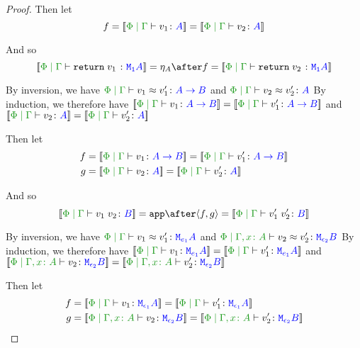 \documentclass{report}
\begin{document}
\begin{framed}
\begin{proof}
        Then let
        \begin{equation}
            f = \deno{\gpetyperelation{v_1}{A}} = \deno{\gpetyperelation{v_2}{A}}
        \end{equation}
        
        And so
        \begin{equation}
            \deno{\gpetyperelation{\return{v_1}}{\M{\1}{A}}} = \point{A}\after f = \deno{\gpetyperelation{\return{v_2}}{\M{\1}{A}}}
        \end{equation}
        
        
        By inversion, we have $\gpeberelation{v_1}{v_1'}{\ab}$ and $\gpeberelation{v_2}{v_2'}{A}$
        By induction, we therefore have $\deno{\gpetyperelation{v_1}{\ab}}= \deno{\gpetyperelation{v_1'}{\ab}}$ and $\deno{\gpetyperelation{v_2}{A}} = \deno{\gpetyperelation{v_2'}{A}}$
        
        Then let
        \begin{align*}
            f &{}= \deno{\gpetyperelation{v_1}{\ab}} = \deno{\gpetyperelation{v_1'}{\ab}}\\
            g &{}= \deno{\gpetyperelation{v_2}{A}} = \deno{\gpetyperelation{v_2'}{A}}
        \end{align*}
        
        
        
        And so
        \begin{equation}
            \deno{\gpetyperelation{\apply{v_1}{v_2}}{B}} = \app\after\pr{f}{g} = \deno{\gpetyperelation{\apply{v_1'}{v_2'}}{B}}
        \end{equation}
        
        
        By inversion, we have $\gpeberelation{v_1}{v_1'}{\M{e_1}{A}}$ and $\eberelation{\P}{\gax}{v_2}{v_2'}{\M{\e_2}{B}}$
        By induction, we therefore have $\deno{\gpetyperelation{v_1}{\M{e_1}{A}}}= \deno{\gpetyperelation{v_1'}{\M{e_1}{A}}}$ and $\deno{\etyperelation{\P}{\gax}{v_2}{\M{\e_2}{B}}} = \deno{\etyperelation{\P}{\gax}{v_2'}{\M{\e_2}{B}}}$
        
        Then let
        \begin{align*}
            f &{}=\deno{\gpetyperelation{v_1}{\M{\e_1}{A}}}= \deno{\gpetyperelation{v_1'}{\M{\e_1}{A}}}\\
            g &{}=\deno{\etyperelation{\P}{\gax}{v_2}{\M{\e_2}{B}}} = \deno{\etyperelation{\P}{\gax}{v_2'}{\M{\e_2}{B}}}
        \end{align*}
        

\end{proof}
\end{framed}
\end{document}
